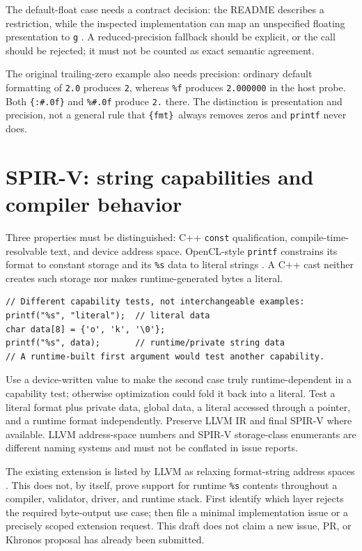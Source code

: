 \documentclass[11pt,letterpaper]{article}
\newcommand{\fmtlib}{\texttt{\{fmt\}}}
\begin{document}
The default-float case needs a contract decision: the README describes a
restriction, while the inspected implementation can map an unspecified
floating presentation to \texttt{g} \cite{ffmt-source}. A reduced-precision
fallback should be explicit, or the call should be rejected; it must not be
counted as exact semantic agreement.

The original trailing-zero example also needs precision: ordinary default
formatting of \texttt{2.0} produces \texttt{2}, whereas \texttt{\%f} produces
\texttt{2.000000} in the host probe. Both \texttt{\{:\#.0f\}} and
\texttt{\%\#.0f} produce \texttt{2.} there. The distinction is presentation
and precision, not a general rule that \fmtlib\ always removes zeros and
\texttt{printf} never does.

\section{SPIR-V: string capabilities and compiler behavior}

Three properties must be distinguished: C++ \texttt{const} qualification,
compile-time-resolvable text, and device address space. OpenCL-style
\texttt{printf} constrains its format to constant storage and its
\texttt{\%s} data to literal strings \cite{opencl-c}. A C++ cast neither
creates such storage nor makes runtime-generated bytes a literal.

\begin{lstlisting}
// Different capability tests, not interchangeable examples:
printf("%s", "literal");  // literal data
char data[8] = {'o', 'k', '\0'};
printf("%s", data);       // runtime/private string data
// A runtime-built first argument would test another capability.
\end{lstlisting}

Use a device-written value to make the second case truly runtime-dependent
in a capability test; otherwise optimization could fold it back into a
literal. Test a literal format plus private data, global data, a literal
accessed through a pointer, and a runtime format independently. Preserve
LLVM IR and final SPIR-V where available. LLVM address-space numbers and
SPIR-V storage-class enumerants are different naming systems and must not
be conflated in issue reports.

The existing extension
 is listed by LLVM as
relaxing format-string address spaces \cite{llvm-spirv}. This does not, by
itself, prove support for runtime \texttt{\%s} contents throughout a compiler,
validator, driver, and runtime stack. First identify which layer rejects the
required byte-output use case; then file a minimal implementation issue or a
precisely scoped extension request. This draft does not claim a new issue,
PR, or Khronos proposal has already been submitted.
\end{document}
